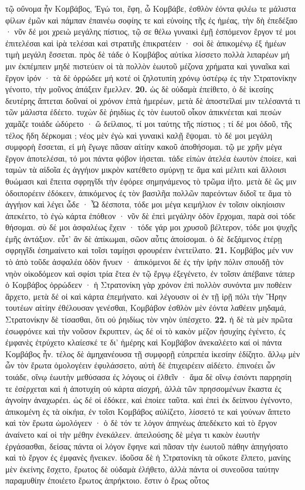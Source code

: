 \documentclass[a4paper, 11pt, oneside, polutonikogreek, german]{article}
\begin{document}
τῷ οὔνομα ἦν Κομβάβος, Ἐγώ τοι, ἔφη, ὦ Κομβάβε, ἐσθλὸν ἐόντα φιλέω τε μάλιστα φίλων ἐμῶν καὶ πάμπαν ἐπαινέω σοφίης τε καὶ εὐνοίης τῆς ἐς ἡμέας, τὴν δὴ ἐπεδέξαο · νῦν δέ μοι χρειὼ μεγάλης πίστιος, τῷ σε θέλω γυναικὶ ἐμῇ ἑσπόμενον ἔργον τέ μοι ἐπιτελέσαι καὶ ἱρὰ τελέσαι καὶ στρατιῆς ἐπικρατέειν · σοὶ δὲ ἀπικομένῳ ἐξ ἡμέων τιμὴ μεγάλη ἔσσεται. πρὸς δὲ τάδε ὁ Κομβάβος αὐτίκα λίσσετο πολλὰ λιπαρέων μή μιν ἐκπέμπειν μηδὲ πιστεύειν οἱ τὰ πολλὸν ἑωυτοῦ μέζονα χρήματα καὶ γυναῖκα καὶ ἔργον ἱρόν · τὰ δὲ ὀρρώδεε μή κοτέ οἱ ζηλοτυπίη χρόνῳ ὑστέρῳ ἐς τὴν Στρατονίκην γένοιτο, τὴν μοῦνος ἀπάξειν ἔμελλεν. \textbf{20.} ὡς δὲ οὐδαμὰ ἐπείθετο, ὁ δὲ ἱκεσίης δευτέρης ἅπτεται δοῦναί οἱ χρόνον ἑπτὰ ἡμερέων, μετὰ δὲ ἀποστεῖλαί μιν τελέσαντά τι τῶν μάλιστα ἐδέετο. τυχὼν δὲ ῥηιδίως ἐς τὸν ἑωυτοῦ οἶκον ἀπικνέεται καὶ πεσὼν χαμᾶζε τοιάδε ὠδύρετο · ὢ δείλαιος, τί μοι ταύτης τῆς πίστιος ; τί δέ μοι ὁδοῦ, τῆς τέλος ἤδη δέρκομαι ; νέος μὲν ἐγὼ καὶ γυναικὶ καλῇ ἕψομαι. τὸ δέ μοι μεγάλη συμφορὴ ἔσσεται, εἰ μὴ ἔγωγε πᾶσαν αἰτίην κακοῦ ἀποθήσομαι. τῷ με χρῆν μέγα ἔργον ἀποτελέσαι, τό μοι πάντα φόβον ἰήσεται. τάδε εἰπὼν ἀτελέα ἑωυτὸν ἐποίεε, καὶ ταμὼν τὰ αἰδοῖα ἐς ἀγγήιον μικρὸν κατέθετο σμύρνῃ τε ἅμα καὶ μέλιτι καὶ ἄλλοισι θυώμασι καὶ ἔπειτα σφρηγῖδι τὴν ἐφόρεε σημηνάμενος τὸ τρῶμα ἰῆτο. μετὰ δὲ ὥς μιν ὁδοιπορέειν ἐδόκεεν, ἀπικόμενος ἐς τὸν βασιλῆα πολλῶν παρεόντων διδοῖ τε ἅμα τὸ ἀγγήιον καὶ λέγει ὧδε · Ὦ δέσποτα, τόδε μοι μέγα κειμήλιον ἐν τοῖσιν οἰκηίοισιν ἀπεκέετο, τὸ ἐγὼ κάρτα ἐπόθεον · νῦν δὲ ἐπεὶ μεγάλην ὁδὸν ἔρχομαι, παρὰ σοὶ τόδε θήσομαι. σὺ δέ μοι ἀσφαλέως ἔχειν · τόδε γάρ μοι χρυσοῦ βέλτερον, τόδε μοι ψυχῆς ἐμῆς ἀντάξιον. εὖτ' ἂν δὲ ἀπίκωμαι, σῶον αὖτις ἀποίσομαι. ὁ δὲ δεξάμενος ἑτέρῃ σφρηγῖδι ἐσημαίνετο καὶ τοῖσι ταμίῃσι φρουρέειν ἐνετείλατο. \textbf{21.} Κομβάβος μέν νυν τὸ ἀπὸ τοῦδε ἀσφαλέα ὁδὸν ἤνυεν · ἀπικόμενοι δὲ ἐς τὴν ἱρὴν πόλιν σπουδῇ τὸν νηὸν οἰκοδόμεον καὶ σφίσι τρία ἔτεα ἐν τῷ ἔργῳ ἐξεγένετο, ἐν τοῖσιν ἀπέβαινε τάπερ ὁ Κομβάβος ὀρρώδεεν · ἡ Στρατονίκη γὰρ χρόνον ἐπὶ πολλὸν συνόντα μιν ποθέειν ἄρχετο, μετὰ δέ οἱ καὶ κάρτα ἐπεμήνατο. καὶ λέγουσιν οἱ ἐν τῇ ἱρῇ πόλι τὴν Ἥρην τουτέων αἰτίην ἐθέλουσαν γενέσθαι, Κομβάβον ἐσθλὸν μὲν ἐόντα λαθέειν μηδαμά, Στρατονίκην δὲ τίσασθαι, ὅτι οὐ ῥηιδίως τὸν νηὸν ὑπέσχετο. \textbf{22.} ἡ δὲ τὰ μὲν πρῶτα ἐσωφρόνεε καὶ τὴν νοῦσον ἔκρυπτεν, ὡς δέ οἱ τὸ κακὸν μέζον ἡσυχίης ἐγένετο, ἐς ἐμφανὲς ἐτρύχετο κλαίεσκέ τε δι' ἡμέρης καὶ Κομβάβον ἀνεκαλέετο καί οἱ πάντα Κομβάβος ἦν. τέλος δὲ ἀμηχανέουσα τῇ συμφορῇ εὐπρεπέα ἱκεσίην ἐδίζητο. ἄλλῳ μὲν ὦν τὸν ἔρωτα ὁμολογέειν ἐφυλάσσετο, αὐτὴ δὲ ἐπιχειρέειν αἰδέετο. ἐπινοέει ὦν τοιάδε, οἴνῳ ἑωυτὴν μεθύσασα ἐς λόγους οἱ ἐλθεῖν · ἅμα δὲ οἴνῳ ἐσιόντι παρρησίη τε ἐσέρχεται καὶ ἡ ἀποτυχίη οὐ κάρτα αἰσχρή, ἀλλὰ τῶν πρησσομένων ἕκαστα ἐς ἀγνοίην ἀναχωρέει. ὡς δέ οἱ ἐδόκεε, καὶ ἐποίεε ταῦτα. καὶ ἐπεὶ ἐκ δείπνου ἐγένοντο, ἀπικομένη ἐς τὰ οἰκήια, ἐν τοῖσι Κομβάβος αὐλίζετο, λίσσετό τε καὶ γούνων ἅπτετο καὶ τὸν ἔρωτα ὡμολόγεεν · ὁ δὲ τόν τε λόγον ἀπηνέως ἀπεδέκετο καὶ τὸ ἔργον ἀναίνετο καί οἱ τὴν μέθην ἐνεκάλεεν. ἀπειλούσης δὲ μέγα τι κακὸν ἑωυτὴν ἐργάσασθαι, δείσας πάντα οἱ λόγον ἔφηνε καὶ πᾶσαν τὴν ἑωυτοῦ πάθην ἀπηγήσατο καὶ τὸ ἔργον ἐς ἐμφανὲς ἤνεικεν. ἰδοῦσα δὲ ἡ Στρατονίκη τὰ οὔκοτε ἔλπετο, μανίης μὲν ἐκείνης ἔσχετο, ἔρωτος δὲ οὐδαμὰ ἐλήθετο, ἀλλὰ πάντα οἱ συνεοῦσα ταύτην παραμυθίην ἐποιέετο ἔρωτος ἀπρήκτοιο. ἔστιν ὁ ἔρως οὗτος 
\end{document}

